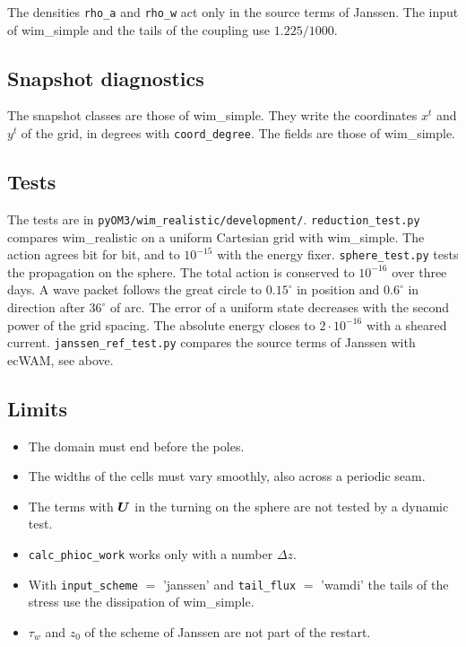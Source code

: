 \documentclass[12pt]{article}
\renewcommand{\v}[1]{{\mbox{\boldmath$ #1 $}}}  %
\begin{document}
\noindent
The densities \verb|rho_a| and \verb|rho_w| act only in the source terms of Janssen.
The input of wim\_simple and the tails of the coupling use $1.225/1000$.

\subsection*{Snapshot diagnostics}

The snapshot classes are those of wim\_simple.
They write the coordinates $x^t$ and $y^t$ of the grid, in degrees with \verb|coord_degree|.
The fields are those of wim\_simple.

\subsection*{Tests}

The tests are in \verb|pyOM3/wim_realistic/development/|.
\verb|reduction_test.py| compares wim\_realistic on a uniform Cartesian grid with wim\_simple.
The action agrees bit for bit, and to $10^{-15}$ with the energy fixer.
\verb|sphere_test.py| tests the propagation on the sphere.
The total action is conserved to $10^{-16}$ over three days.
A wave packet follows the great circle to $0.15^\circ$ in position and $0.6^\circ$ in direction after $36^\circ$ of arc.
The error of a uniform state decreases with the second power of the grid spacing.
The absolute energy closes to $2 \cdot 10^{-16}$ with a sheared current.
\verb|janssen_ref_test.py| compares the source terms of Janssen with ecWAM, see above.

\subsection*{Limits}

\begin{itemize}
\item The domain must end before the poles.
\item The widths of the cells must vary smoothly, also across a periodic seam.
\item The terms with $\v U$ in the turning on the sphere are not tested by a dynamic test.
\item \verb|calc_phioc_work| works only with a number $\Delta z$.
\item With \verb|input_scheme| $=$ 'janssen' and \verb|tail_flux| $=$ 'wamdi' the tails of the stress use the dissipation of wim\_simple.
\item $\tau_w$ and $z_0$ of the scheme of Janssen are not part of the restart.
\end{itemize}
\end{document}
